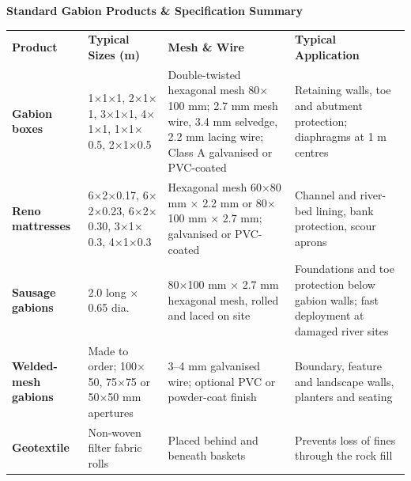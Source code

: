 \documentclass[a4paper,11pt]{article}
\begin{document}
\vfill

\noindent
{\large\bfseries\color{mhnavy} Standard Gabion Products \& Specification Summary}
\vspace{0.12cm}

{\fontsize{7.6pt}{9.4pt}\selectfont\noindent
\renewcommand{\arraystretch}{1.18}
\begin{tabularx}{\textwidth}{@{}p{2.4cm} p{4.4cm} p{5.2cm} X@{}}
\rowcolor{mhnavy}
{\color{white}\bfseries Product} &
{\color{white}\bfseries Typical Sizes (m)} &
{\color{white}\bfseries Mesh \& Wire} &
{\color{white}\bfseries Typical Application} \\
\rowcolor{mhbluelight}
\bfseries Gabion boxes & 1$\times$1$\times$1, 2$\times$1$\times$1, 3$\times$1$\times$1, 4$\times$1$\times$1, 1$\times$1$\times$0.5, 2$\times$1$\times$0.5 & Double-twisted hexagonal mesh 80$\times$100 mm; 2.7 mm mesh wire, 3.4 mm selvedge, 2.2 mm lacing wire; Class A galvanised or PVC-coated & Retaining walls, toe and abutment protection; diaphragms at 1 m centres \\
\bfseries Reno mattresses & 6$\times$2$\times$0.17, 6$\times$2$\times$0.23, 6$\times$2$\times$0.30, 3$\times$1$\times$0.3, 4$\times$1$\times$0.3 & Hexagonal mesh 60$\times$80 mm $\times$ 2.2 mm or 80$\times$100 mm $\times$ 2.7 mm; galvanised or PVC-coated & Channel and river-bed lining, bank protection, scour aprons \\
\rowcolor{mhbluelight}
\bfseries Sausage gabions & 2.0 long $\times$ 0.65 dia. & 80$\times$100 mm $\times$ 2.7 mm hexagonal mesh, rolled and laced on site & Foundations and toe protection below gabion walls; fast deployment at damaged river sites \\
\bfseries Welded-mesh gabions & Made to order; 100$\times$50, 75$\times$75 or 50$\times$50 mm apertures & 3--4 mm galvanised wire; optional PVC or powder-coat finish & Boundary, feature and landscape walls, planters and seating \\
\rowcolor{mhbluelight}
\bfseries Geotextile & Non-woven filter fabric rolls & Placed behind and beneath baskets & Prevents loss of fines through the rock fill \\
\end{tabularx}
\renewcommand{\arraystretch}{1}
}

\vspace{0.10cm}
\end{document}
